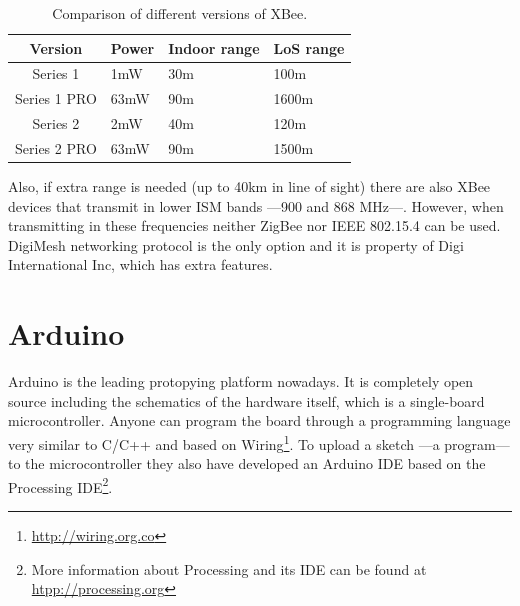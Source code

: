 \begin{table}[ht] 
\centering
\begin{tabular}{c|l l l}
    Version     & Power                 & Indoor range     & LoS range\footnotemark[7]\\
\hline
Series 1        & 1mW                   & 30m              & 100m\\
Series 1 PRO    & 63mW\footnotemark[8]  & 90m              & 1600m\\
Series 2        & 2mW                   & 40m              & 120m\\
Series 2 PRO    & 63mW\footnotemark[8]  & 90m              & 1500m\\
\end{tabular}
\caption{Comparison of different versions of XBee\textregistered.}
\label{tab:xbee_versions}
\end{table}


Also, if extra range is needed (up to 40km in line of sight) there are also XBee\textregistered{} devices that transmit in lower ISM bands ---900 and 868 MHz---. However, when transmitting in these frequencies neither ZigBee nor IEEE 802.15.4 can be used. DigiMesh\texttrademark{} networking protocol is the only option and it is property of Digi International Inc, which has extra features.



\section{Arduino}

Arduino is the leading protopying platform nowadays. It is completely open source including the schematics of the hardware itself, which is a single-board microcontroller. Anyone can program the board through a programming language very similar to C/C++ and based on Wiring\footnote{\url{http://wiring.org.co}}. To upload a sketch ---a program--- to the microcontroller they also have developed an Arduino IDE based on the Processing IDE\footnote{More information about Processing and its IDE can be found at \url{htpp://processing.org}}.

